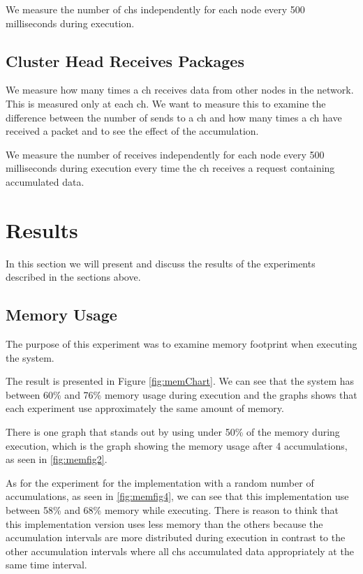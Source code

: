 \documentclass[USenglish]{uit-thesis}
\begin{document}
We measure the number of \glspl{ch} independently for each node every 500 milliseconds during execution.


\subsection{Cluster Head Receives Packages} \label{eva:ch_recv}
We measure how many times a \gls{ch} receives data from other nodes in the network. This is measured only at each \gls{ch}. We want to measure this to examine the difference between the number of sends to a \gls{ch} and how many times a \gls{ch} have received a packet and to see the effect of the accumulation.


We measure the number of receives independently for each node every 500 milliseconds during execution every time the \gls{ch} receives a request containing accumulated data.


\newpage

\section{Results}

In this section we will present and discuss the results of the experiments described in the sections above.

\subsection{Memory Usage}

The purpose of this experiment was to examine memory footprint when executing the system.

The result is presented in Figure \ref{fig:memChart}. We can see that the system has between 60\% and 76\% memory usage during execution and the graphs shows that each experiment use approximately the same amount of memory.

There is one graph that stands out by using under 50\% of the memory during execution, which is the graph showing the memory usage after 4 accumulations, as seen in \autoref{fig:memfig2}.

As for the experiment for the implementation with a random number of accumulations, as seen in \autoref{fig:memfig4}, we can see that this implementation use between 58\% and 68\% memory while executing. There is reason to think that this implementation version uses less memory than the others because the accumulation intervals are more distributed during execution in contrast to the other accumulation intervals where all \glspl{ch} accumulated data appropriately at the same time interval.
\end{document}
